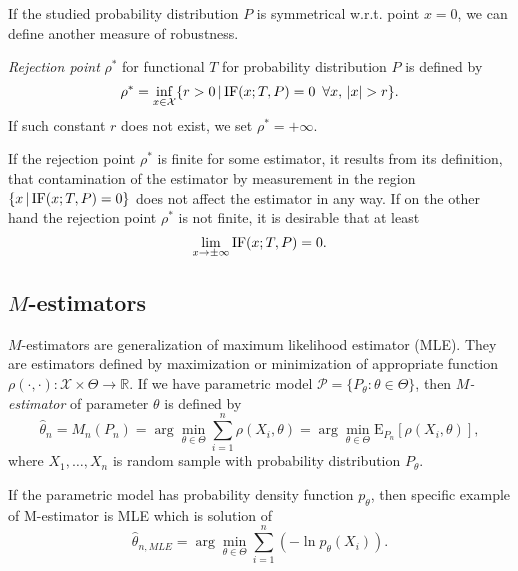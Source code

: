 \noindent If the studied probability distribution $P$ is symmetrical w.r.t. point $x=0$, we can define another measure of robustness.

\begin{definition}
	\emph{Rejection point} $\rho^*$ for functional $T$ for probability distribution $P$ is defined by 
	\begin{equation}
			\rho^* = \inf_{x \in \mathcal{X}} \lbrace r>0 \, | \, \mathrm{IF}({x};T,P) = 0 \:\; \forall x,\, |x| > r\rbrace.
	\end{equation}
	If such constant $r$  does not exist, we set $\rho^* = + \infty.$ 
\end{definition}

\noindent If the rejection point $\rho^*$ is finite for some estimator, it results from its definition, that contamination of the estimator by measurement in the region  $\lbrace x \, | \, \mathrm{IF}({x};T,P) = 0 \rbrace$ does not affect the estimator in any way. If on the other hand the rejection point $\rho^*$ is not finite, it is desirable that at least
\begin{equation}
	\lim_{x \rightarrow \pm\infty} \mathrm{IF}({x};T,P) = 0.
\end{equation}

\subsection{\texorpdfstring{$M$}{M}-estimators}
$M$-estimators are generalization of maximum likelihood estimator (MLE). They are estimators defined by maximization or minimization of appropriate function $\rho(\cdot,\cdot):\mathcal{X}\times \Theta \rightarrow \mathbb{R}$. If we have parametric model $\mathcal{P} = \lbrace P_\theta : \theta \in \Theta\rbrace$, then $M$\emph{-estimator} of parameter $\theta$ is defined by 
\begin{equation}
	\hat{\theta}_n = M_n(P_n) = \arg \min_{\theta \in \Theta} \sum_{i=1}^n \rho(X_i,\theta) = \arg \min_{\theta \in \Theta} \mathrm{E}_{P_n}\left[ \rho(X_i,\theta) \right],
	\label{Modhad1}
\end{equation}
where $X_1,\ldots,X_n$ is random sample with probability distribution  $P_\theta$.

If the parametric model has probability density function $p_\theta$, then specific example of M-estimator is MLE which is solution of
\begin{equation}
	\hat{\theta}_{n, MLE} = \arg\min_{\theta \in \Theta} \sum_{i=1}^n \left( -\ln p_\theta(X_i)\right).
\end{equation}

